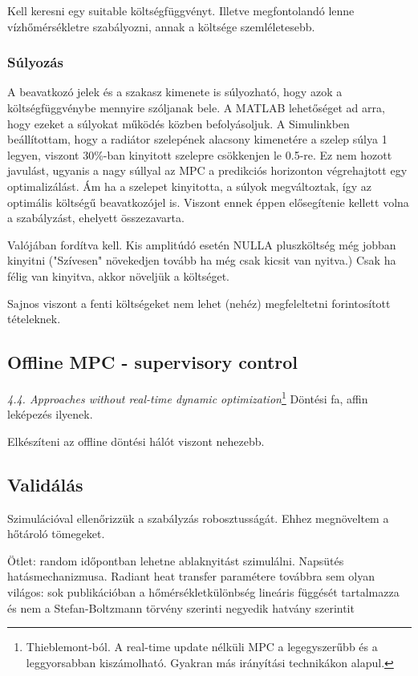 Kell keresni egy suitable költségfüggvényt. Illetve megfontolandó lenne vízhőmérsékletre szabályozni, annak a költsége szemléletesebb.

\subsubsection{Súlyozás}
A beavatkozó jelek és a szakasz kimenete is súlyozható, hogy azok a költségfüggvénybe mennyire szóljanak bele. A MATLAB lehetőséget ad arra, hogy ezeket a súlyokat működés közben befolyásoljuk. A Simulinkben beállítottam, hogy a radiátor szelepének alacsony kimenetére a szelep súlya 1 legyen, viszont 30\%-ban kinyitott szelepre csökkenjen le 0.5-re. Ez nem hozott javulást, ugyanis a nagy súllyal az MPC a predikciós horizonton végrehajtott egy optimalizálást. Ám ha a szelepet kinyitotta, a súlyok megváltoztak, így az optimális költségű beavatkozójel is. Viszont ennek éppen elősegítenie kellett volna a szabályzást, ehelyett összezavarta.


Valójában fordítva kell. Kis amplitúdó esetén NULLA pluszköltség még jobban kinyitni ("Szívesen" növekedjen tovább ha még csak kicsit van nyitva.) Csak ha félig van kinyitva, akkor növeljük a költséget.

Sajnos viszont a fenti költségeket nem lehet (nehéz) megfeleltetni forintosított tételeknek.

\hrulefill

\subsection{Offline MPC - supervisory control}

\textit{4.4. Approaches without real-time dynamic optimization}\footnote{Thieblemont-ból. A real-time update nélküli MPC a legegyszerűbb és a leggyorsabban kiszámolható. Gyakran más irányítási technikákon alapul.} Döntési fa, affin leképezés ilyenek.

Elkészíteni az offline döntési hálót viszont nehezebb.


	


\subsection{Validálás}
Szimulációval ellenőrizzük a szabályzás robosztusságát. Ehhez megnöveltem a hőtároló tömegeket.

Ötlet: random időpontban lehetne ablaknyitást szimulálni.
Napsütés hatásmechanizmusa.
Radiant heat transfer paramétere továbbra sem olyan világos: sok publikációban a hőmérsékletkülönbség lineáris függését tartalmazza és nem a Stefan-Boltzmann törvény szerinti negyedik hatvány szerintit